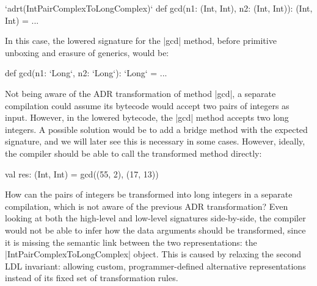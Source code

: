 \begin{lstlisting-nobreak}
`adrt(IntPairComplexToLongComplex)` {
  def gcd(n1: (Int, Int), n2: (Int, Int)): (Int, Int) = ...
}
\end{lstlisting-nobreak}

In this case, the lowered signature for the |gcd| method, before primitive unboxing and erasure of generics, would be:

\begin{lstlisting-nobreak}
def gcd(n1: `Long`, n2: `Long`): `Long` = ...
\end{lstlisting-nobreak}

Not being aware of the ADR transformation of method |gcd|, a separate compilation could assume its bytecode would accept two pairs of integers as input. However, in the lowered bytecode, the |gcd| method accepts two long integers. A possible solution would be to add a bridge method with the expected signature, and we will later see this is necessary in some cases. However, ideally, the compiler should be able to call the transformed method directly:


\begin{lstlisting-nobreak}
val res: (Int, Int) = gcd((55, 2), (17, 13))
\end{lstlisting-nobreak}

How can the pairs of integers be transformed into long integers in a separate compilation, which is not aware of the previous ADR transformation? Even looking at both the high-level and low-level signatures side-by-side, the compiler would not be able to infer how the data arguments should be transformed, since it is missing the semantic link between the two representations: the |IntPairComplexToLongComplex| object. This is caused by relaxing the second LDL invariant: allowing custom, programmer-defined alternative representations instead of its fixed set of transformation rules.

